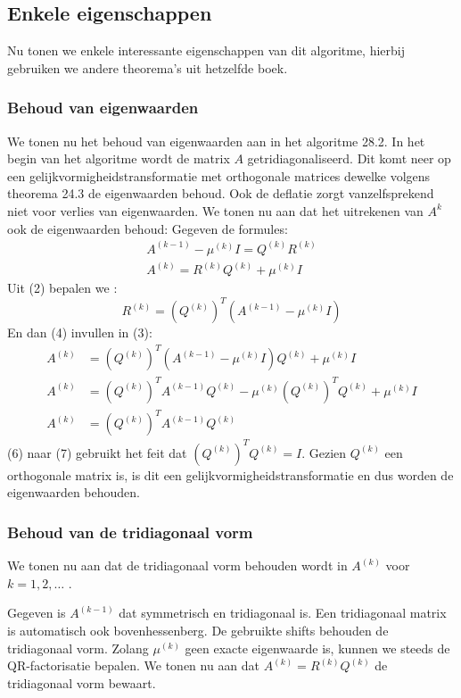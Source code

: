 \documentclass[a4paper]{article}
\begin{document}
\subsection{Enkele eigenschappen}
	Nu tonen we enkele interessante eigenschappen van dit algoritme, hierbij gebruiken we andere theorema's uit hetzelfde boek.
\subsubsection{Behoud van eigenwaarden}
	We tonen nu het behoud van eigenwaarden aan in het algoritme 28.2.
	In het begin van het algoritme wordt de matrix $A$ getridiagonaliseerd. Dit komt neer op een gelijkvormigheidstransformatie met orthogonale matrices dewelke volgens theorema 24.3 de eigenwaarden behoud.
	Ook de deflatie zorgt vanzelfsprekend niet voor verlies van eigenwaarden.
	We tonen nu aan dat het uitrekenen van $A^{k}$ ook de eigenwaarden behoud:
	Gegeven de formules:
	\begin{gather}
		A^{(k-1)} - \mu ^{(k)}I = Q^{(k)}R^{(k)} \\
		A^{(k)} = R^{(k)}Q^{(k)} + \mu ^{(k)}I
	\end{gather}
	Uit (2) bepalen we :
	\begin{equation}
		R^{(k)} = (Q^{(k)})^T(A^{(k-1)}-\mu ^{(k)}I)		
	\end{equation}
	En dan (4) invullen in (3):
	\begin{align}
		A^{(k)} &= (Q^{(k)})^T(A^{(k-1)} - \mu ^{(k)}I)Q^{(k)} + \mu ^{(k)}I\\
		A^{(k)} &= (Q^{(k)})^TA^{(k-1)}Q^{(k)} - \mu ^{(k)}(Q^{(k)})^TQ^{(k)} + \mu ^{(k)}I\\
		A^{(k)} &= (Q^{(k)})^TA^{(k-1)}Q^{(k)}
	\end{align}
	(6) naar (7) gebruikt het feit dat $(Q^{(k)})^TQ^{(k)} = I$.
	Gezien $Q^{(k)}$ een orthogonale matrix is, is dit een gelijkvormigheidstransformatie en dus worden de eigenwaarden behouden.
	
\subsubsection{Behoud van de tridiagonaal vorm}
	We tonen nu aan dat de tridiagonaal vorm behouden wordt in $A^{(k)}$ voor $k = 1,2,\dots$ .
	
	\noindent Gegeven is $A^{(k-1)}$ dat symmetrisch en tridiagonaal is. Een tridiagonaal matrix is automatisch ook bovenhessenberg.
	De gebruikte shifts behouden de tridiagonaal vorm. Zolang $\mu ^{(k)}$ geen exacte eigenwaarde is, kunnen we steeds de QR-factorisatie bepalen. We tonen nu aan dat $A^{(k)} = R^{(k)}Q^{(k)}$ de tridiagonaal vorm bewaart.
	
\end{document}
